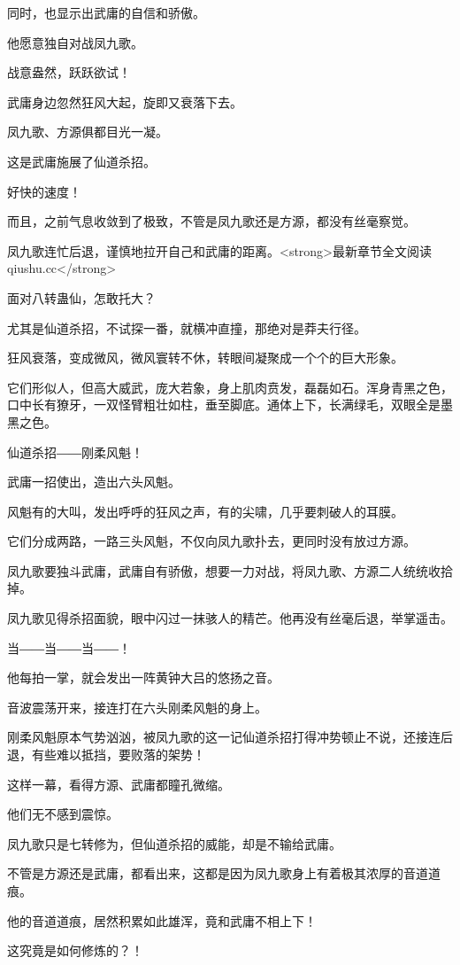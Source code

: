 \begin{this_body}
同时，也显示出武庸的自信和骄傲。

他愿意独自对战凤九歌。

战意盎然，跃跃欲试！

武庸身边忽然狂风大起，旋即又衰落下去。

凤九歌、方源俱都目光一凝。

这是武庸施展了仙道杀招。

好快的速度！

而且，之前气息收敛到了极致，不管是凤九歌还是方源，都没有丝毫察觉。

凤九歌连忙后退，谨慎地拉开自己和武庸的距离。<strong>最新章节全文阅读qiushu.cc</strong>

面对八转蛊仙，怎敢托大？

尤其是仙道杀招，不试探一番，就横冲直撞，那绝对是莽夫行径。

狂风衰落，变成微风，微风寰转不休，转眼间凝聚成一个个的巨大形象。

它们形似人，但高大威武，庞大若象，身上肌肉贲发，磊磊如石。浑身青黑之色，口中长有獠牙，一双怪臂粗壮如柱，垂至脚底。通体上下，长满绿毛，双眼全是墨黑之色。

仙道杀招――刚柔风魁！

武庸一招使出，造出六头风魁。

风魁有的大叫，发出呼呼的狂风之声，有的尖啸，几乎要刺破人的耳膜。

它们分成两路，一路三头风魁，不仅向凤九歌扑去，更同时没有放过方源。

凤九歌要独斗武庸，武庸自有骄傲，想要一力对战，将凤九歌、方源二人统统收拾掉。

凤九歌见得杀招面貌，眼中闪过一抹骇人的精芒。他再没有丝毫后退，举掌遥击。

当――当――当――！

他每拍一掌，就会发出一阵黄钟大吕的悠扬之音。

音波震荡开来，接连打在六头刚柔风魁的身上。

刚柔风魁原本气势汹汹，被凤九歌的这一记仙道杀招打得冲势顿止不说，还接连后退，有些难以抵挡，要败落的架势！

这样一幕，看得方源、武庸都瞳孔微缩。

他们无不感到震惊。

凤九歌只是七转修为，但仙道杀招的威能，却是不输给武庸。

不管是方源还是武庸，都看出来，这都是因为凤九歌身上有着极其浓厚的音道道痕。

他的音道道痕，居然积累如此雄浑，竟和武庸不相上下！

这究竟是如何修炼的？！


\end{this_body}

